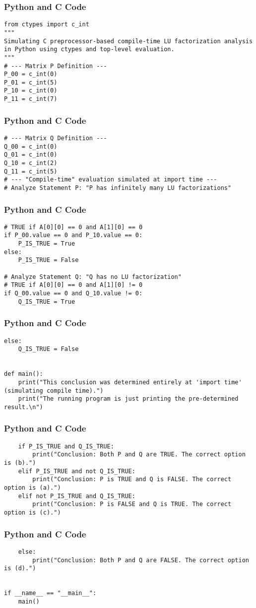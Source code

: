 \documentclass{beamer}
\begin{document}
\begin{frame}[fragile]
\frametitle{Python and C Code}
\begin{lstlisting}
from ctypes import c_int
"""
Simulating C preprocessor-based compile-time LU factorization analysis
in Python using ctypes and top-level evaluation.
"""
# --- Matrix P Definition ---
P_00 = c_int(0)
P_01 = c_int(5)
P_10 = c_int(0)
P_11 = c_int(7)
\end{lstlisting}
\end{frame}

\begin{frame}[fragile]
\frametitle{Python and C Code}
\begin{lstlisting}
# --- Matrix Q Definition ---
Q_00 = c_int(0)
Q_01 = c_int(0)
Q_10 = c_int(2)
Q_11 = c_int(5)
# --- "Compile-time" evaluation simulated at import time ---
# Analyze Statement P: "P has infinitely many LU factorizations"
\end{lstlisting}
\end{frame}

\begin{frame}[fragile]
\frametitle{Python and C Code}
\begin{lstlisting}
# TRUE if A[0][0] == 0 and A[1][0] == 0
if P_00.value == 0 and P_10.value == 0:
    P_IS_TRUE = True
else:
    P_IS_TRUE = False

# Analyze Statement Q: "Q has no LU factorization"
# TRUE if A[0][0] == 0 and A[1][0] != 0
if Q_00.value == 0 and Q_10.value != 0:
    Q_IS_TRUE = True
\end{lstlisting}
\end{frame}

\begin{frame}[fragile]
\frametitle{Python and C Code}
\begin{lstlisting}
else:
    Q_IS_TRUE = False


def main():
    print("This conclusion was determined entirely at 'import time' (simulating compile time).")
    print("The running program is just printing the pre-determined result.\n")
\end{lstlisting}
\end{frame}

\begin{frame}[fragile]
\frametitle{Python and C Code}
\begin{lstlisting}
    if P_IS_TRUE and Q_IS_TRUE:
        print("Conclusion: Both P and Q are TRUE. The correct option is (b).")
    elif P_IS_TRUE and not Q_IS_TRUE:
        print("Conclusion: P is TRUE and Q is FALSE. The correct option is (a).")
    elif not P_IS_TRUE and Q_IS_TRUE:
        print("Conclusion: P is FALSE and Q is TRUE. The correct option is (c).")
\end{lstlisting}
\end{frame}

\begin{frame}[fragile]
\frametitle{Python and C Code}
\begin{lstlisting}
    else:
        print("Conclusion: Both P and Q are FALSE. The correct option is (d).")


if __name__ == "__main__":
    main()
\end{lstlisting}
\end{frame}
\end{document}
